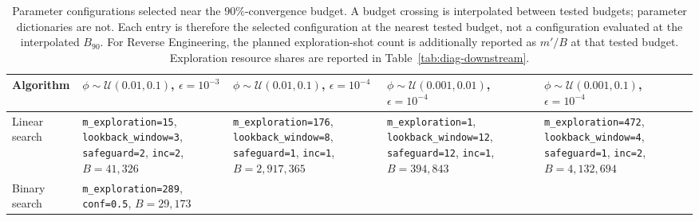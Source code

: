 \begin{table}[ht]
\centering
\scriptsize
\caption{Parameter configurations selected near the $90\%$-convergence budget. A budget crossing is interpolated between tested budgets; parameter dictionaries are not. Each entry is therefore the selected configuration at the nearest tested budget, not a configuration evaluated at the interpolated $B_{90}$. For Reverse Engineering, the planned exploration-shot count is additionally reported as $m'/B$ at that tested budget. Exploration resource shares are reported in Table~\ref{tab:diag-downstream}.}
\label{tab:opt-param-second-tab}
\setlength{\tabcolsep}{2pt}
\begin{tabular}{lllll}
\toprule
Algorithm
& \makecell{$\phi \sim \mathcal{U}(0.01,0.1)$, \\ $\epsilon=10^{-3}$}
& \makecell{$\phi \sim \mathcal{U}(0.01,0.1)$, \\ $\epsilon=10^{-4}$}
& \makecell{$\phi \sim \mathcal{U}(0.001,0.01)$, \\ $\epsilon=10^{-4}$}
& \makecell{$\phi \sim \mathcal{U}(0.001,0.1)$, \\ $\epsilon=10^{-4}$} \\
\midrule
Linear search
& \makecell{\texttt{m\_exploration=15}, \\ \texttt{lookback\_window=3}, \\ \texttt{safeguard=2}, \\ \texttt{inc=2}, \\ {\scriptsize $B=41{,}326$}}
& \makecell{\texttt{m\_exploration=176}, \\ \texttt{lookback\_window=8}, \\ \texttt{safeguard=1}, \\ \texttt{inc=1}, \\ {\scriptsize $B=2{,}917{,}365$}}
& \makecell{\texttt{m\_exploration=1}, \\ \texttt{lookback\_window=12}, \\ \texttt{safeguard=12}, \\ \texttt{inc=1}, \\ {\scriptsize $B=394{,}843$}}
& \makecell{\texttt{m\_exploration=472}, \\ \texttt{lookback\_window=4}, \\ \texttt{safeguard=1}, \\ \texttt{inc=2}, \\ {\scriptsize $B=4{,}132{,}694$}} \\
\midrule
Binary search
& \makecell{\texttt{m\_exploration=289}, \\ \texttt{conf=0.5}, \\ {\scriptsize $B=29{,}173$}}

\end{tabular}
\end{table}
